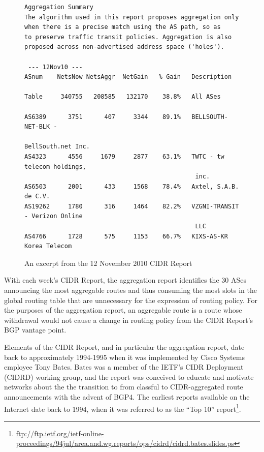 \begin{figure}
\begin{lstlisting}[frame=trlb]
Aggregation Summary
The algorithm used in this report proposes aggregation only
when there is a precise match using the AS path, so as
to preserve traffic transit policies. Aggregation is also
proposed across non-advertised address space ('holes').

 --- 12Nov10 ---
ASnum    NetsNow NetsAggr  NetGain   % Gain   Description

Table     340755   208585   132170    38.8%   All ASes

AS6389      3751      407     3344    89.1%   BELLSOUTH-NET-BLK -
                                               BellSouth.net Inc.
AS4323      4556     1679     2877    63.1%   TWTC - tw telecom holdings,
                                               inc.
AS6503      2001      433     1568    78.4%   Axtel, S.A.B. de C.V.
AS19262     1780      316     1464    82.2%   VZGNI-TRANSIT - Verizon Online
                                               LLC
AS4766      1728      575     1153    66.7%   KIXS-AS-KR Korea Telecom
\end{lstlisting}
\caption{An excerpt from the 12 November 2010 CIDR Report}
\label{fig:ex_cidr_report}
\end{figure}

With each week's CIDR Report, the aggregation report identifies the 30 ASes
announcing the most aggregable routes and thus consuming the most slots in the
global routing table that are unnecessary for the expression of routing policy.
For the purposes of the aggregation report, an aggregable route is a route
whose withdrawal would not cause a change in routing policy from the CIDR
Report's BGP vantage point.

Elements of the CIDR Report, and in particular the aggregation report, date
back to approximately 1994-1995 when it was implemented by Cisco Systems
employee Tony Bates. Bates was a member of the IETF's CIDR Deployment (CIDRD)
working group, and the report was conceived to educate and motivate networks
about the the transition to from classful to CIDR-aggregated route
announcements with the advent of BGP4. The earliest reports available on the
Internet date back to 1994, when it was referred to as the ``Top 10''
report\footnote{\url{ftp://ftp.ietf.org/ietf-online-proceedings/94jul/area.and.wg.reports/ops/cidrd/cidrd.bates.slides.ps}}.

